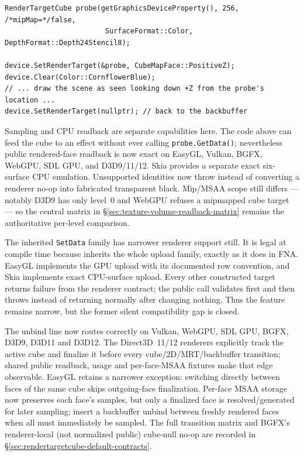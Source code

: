 \begin{lstlisting}
RenderTargetCube probe(getGraphicsDeviceProperty(), 256, /*mipMap=*/false,
                        SurfaceFormat::Color, DepthFormat::Depth24Stencil8);

device.SetRenderTarget(&probe, CubeMapFace::PositiveZ);
device.Clear(Color::CornflowerBlue);
// ... draw the scene as seen looking down +Z from the probe's location ...
device.SetRenderTarget(nullptr); // back to the backbuffer
\end{lstlisting}

Sampling and CPU readback are separate capabilities here. The code above can feed the cube to
an effect without ever calling \texttt{probe.GetData()}; nevertheless public rendered-face
readback is now exact on EasyGL, Vulkan, BGFX, WebGPU, SDL GPU, and D3D9/11/12. Skia provides a
separate exact six-surface CPU emulation. Unsupported identities now throw instead of converting
a renderer no-op into fabricated transparent black. Mip/MSAA scope still differs --- notably
D3D9 has only level~0 and WebGPU refuses a mipmapped cube target --- so the central matrix in
\S\ref{sec:texture-volume-readback-matrix} remains the authoritative per-level comparison.

The inherited \texttt{SetData} family has narrower renderer support still. It is legal at
compile time because  inherits the whole
 upload family, exactly as it does in FNA. EasyGL implements the GPU upload
with its documented row convention, and Skia implements exact CPU-surface upload. Every other
constructed target returns failure from the renderer contract; the public call validates first
and then throws  instead of returning normally after changing
nothing. Thus the feature remains narrow, but the former silent compatibility gap is closed.

The unbind line now routes correctly on Vulkan, WebGPU, SDL GPU, BGFX, D3D9, D3D11 and D3D12.
The Direct3D~11/12 renderers explicitly track the active cube and finalize it before every
cube/2D/MRT/backbuffer transition; shared public readback, usage and per-face-MSAA fixtures make
that edge observable. EasyGL retains a narrower exception: switching directly between faces of
the same cube skips outgoing-face finalization. Per-face MSAA storage now preserves each face's
samples, but only a finalized face is resolved/generated for later sampling; insert a
backbuffer unbind between freshly rendered faces when all must immediately be sampled. The full
transition matrix and BGFX's renderer-local (not normalized public) cube-null no-op are recorded
in \S\ref{sec:rendertargetcube-default-contracts}.


